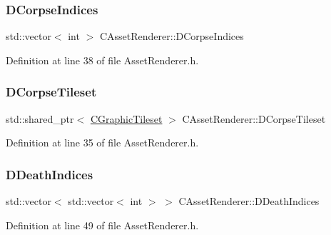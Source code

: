 \subsubsection{\texorpdfstring{D\+Corpse\+Indices}{DCorpseIndices}}
{\footnotesize\ttfamily std\+::vector$<$ int $>$ C\+Asset\+Renderer\+::\+D\+Corpse\+Indices\hspace{0.3cm}{\ttfamily [protected]}}



Definition at line 38 of file Asset\+Renderer.\+h.

\hypertarget{classCAssetRenderer_ab7e40b5fdcb49045250e0467d6318567}{}\label{classCAssetRenderer_ab7e40b5fdcb49045250e0467d6318567} 
\subsubsection{\texorpdfstring{D\+Corpse\+Tileset}{DCorpseTileset}}
{\footnotesize\ttfamily std\+::shared\+\_\+ptr$<$ \hyperlink{classCGraphicTileset}{C\+Graphic\+Tileset} $>$ C\+Asset\+Renderer\+::\+D\+Corpse\+Tileset\hspace{0.3cm}{\ttfamily [protected]}}



Definition at line 35 of file Asset\+Renderer.\+h.

\hypertarget{classCAssetRenderer_a31be8b0e563072ee1168ab11154d15c8}{}\label{classCAssetRenderer_a31be8b0e563072ee1168ab11154d15c8} 
\subsubsection{\texorpdfstring{D\+Death\+Indices}{DDeathIndices}}
{\footnotesize\ttfamily std\+::vector$<$ std\+::vector$<$ int $>$ $>$ C\+Asset\+Renderer\+::\+D\+Death\+Indices\hspace{0.3cm}{\ttfamily [protected]}}



Definition at line 49 of file Asset\+Renderer.\+h.

\hypertarget{classCAssetRenderer_a7598d4658acf64e85ddd6daeca88c8e6}{}\label{classCAssetRenderer_a7598d4658acf64e85ddd6daeca88c8e6} 
